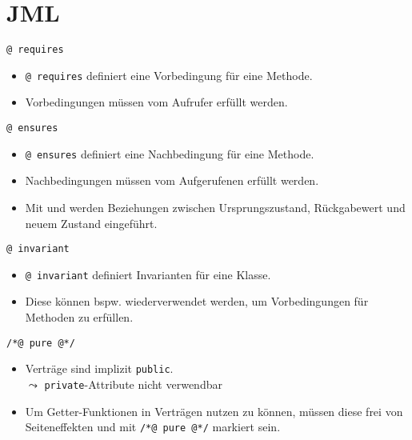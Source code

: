 \documentclass{beamer}
\begin{document}
\section{JML}

\begin{frame}{\texttt{@ requires}}

	\begin{itemize}
		\item \texttt{@ requires} definiert eine Vorbedingung für eine Methode.
		\item Vorbedingungen müssen vom Aufrufer erfüllt werden.
	\end{itemize}
\end{frame}

\begin{frame}{\texttt{@ ensures}}

	\begin{itemize}
		\item \texttt{@ ensures} definiert eine Nachbedingung für eine Methode.
		\item Nachbedingungen müssen vom Aufgerufenen erfüllt werden.
        \item Mit \texttt{\string\old} und \texttt{\string\result} werden Beziehungen zwischen Ursprungszustand, Rückgabewert und neuem Zustand eingeführt.
	\end{itemize}
\end{frame}

\begin{frame}{\texttt{@ invariant}}

	\begin{itemize}
		\item \texttt{@ invariant} definiert Invarianten für eine Klasse.
		\item Diese können bspw. wiederverwendet werden, um Vorbedingungen für Methoden zu erfüllen.
	\end{itemize}
\end{frame}

\begin{frame}{\texttt{/*@ pure @*/}}

	\begin{itemize}
		\item Verträge sind implizit \texttt{public}.\\
		$\leadsto$ \texttt{private}-Attribute nicht verwendbar
		\item Um Getter-Funktionen in Verträgen nutzen zu können, müssen diese frei von Seiteneffekten und mit \texttt{/*@ pure @*/} markiert sein.
	\end{itemize}
\end{frame}
\end{document}

